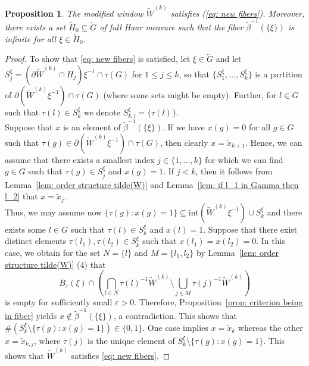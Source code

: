 \documentclass[titlepage,reqno,10pt]{amsart}
\newtheorem{proposition}[theorem]{Proposition}
\theoremstyle{definition}
\newcommand{\tm}{\subseteq}
\newcommand{\kl}{\left(}
\newcommand{\kr}{\right)}
\begin{document}
\begin{proposition}\label{prop: proof of eq: new fibers}
    The modified window $\widetilde{W}^{(k)}$ satisfies (\ref{eq: new fibers}). 
    Moreover, there exists a set $\widetilde{H}_0\tm \overleftarrow{G}$ of full Haar measure such that the fiber $\widetilde{\beta}^{-1}(\{\xi\})$ is infinite for all $\xi\in \widetilde{H}_0$.
\end{proposition}
\begin{proof}
To show that \eqref{eq: new fibers} is satisfied, let $\xi\in \overleftarrow{G}$ and let $S_j^\xi = (\partial \widetilde{W}^{(k)} \cap H_j)\xi^{-1}\cap \tau(G)$ for $1\leq j\leq k$, so that $\{ S_1^\xi,\ldots,S_k^\xi\}$ is a partition of $\partial (\widetilde{W}^{(k)}\xi^{-1})\cap \tau(G)$ (where some sets might be empty).
Further, for $l\in G$ such that $\tau(l)\in S_k^\xi$ we denote $S_{k,l}^\xi = \{\tau(l)\}$.\\
Suppose that $x$ is an element of $\widetilde{\beta}^{-1}(\{\xi\})$.
If we have $x(g)=0$ for all $g\in G$ such that $\tau(g) \in \partial (\widetilde{W}^{(k)}\xi^{-1})\cap \tau(G)$, then clearly $x = \widetilde{x}_{k+1}$.
Hence, we can assume that there exists a smallest index $j\in \{1,\ldots,k\}$ for which we can find $g\in G$ such that $\tau(g)\in S_j^\xi$ and $x(g)=1$.
If $j<k$, then it follows from Lemma~\ref{lem: order structure tilde(W)} and Lemma~\ref{lem: if l_1 in Gamma then l_2} that $x=\widetilde{x}_j$.\\
Thus, we may assume now $\{\tau(g): x(g)=1\} \tm \mathrm{int}(\widetilde{W}^{(k)}\xi^{-1})\cup S_k^\xi$ and there exists some $l\in G$ such that $\tau(l)\in S_k^\xi$ and $x(l) =1$.
Suppose that there exist distinct elements $\tau(l_1),\tau(l_2)\in S_k^\xi$ such that $x(l_1) = x(l_2)=0$.
In this case, we obtain for the set $N = \{l\}$ and $M = \{l_1,l_2\}$ by Lemma~\ref{lem: order structure tilde(W)} (4) that
$$ B_{\varepsilon}(\xi) \cap \kl \bigcap_{l\in N} \tau(l)^{-1}  \widetilde{W}^{(k)}\setminus \bigcup_{j\in M}\tau(j)^{-1} \widetilde{W}^{(k)}\kr$$
is empty for sufficiently small $\varepsilon>0$.
Therefore, Proposition~\ref{prop: criterion being in fiber} yields $x\notin \widetilde{\beta}^{-1}(\{\xi\})$, a contradiction.
This shows that $\#\kl S_k^\xi\setminus \{\tau(g):x(g)=1\}\kr \in\{0,1\}$.
One case implies $x = \widetilde{x}_k$ whereas the other $x= \widetilde{x}_{k,j}$, where $\tau(j)$ is the unique element of $S_k^\xi\setminus \{\tau(g):x(g)=1\}$.
This shows that $\widetilde{W}^{(k)}$ satisfies \eqref{eq: new fibers}.


\end{proof}
\end{document}
